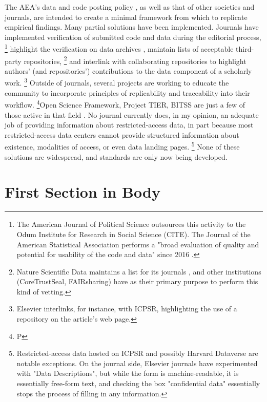 \documentclass[AEJ]{AEA}
\begin{document}
The AEA's data and code posting policy \citep{American_Economic_Association2008-az}, as well as that of other societies and journals, are intended to create a minimal framework from which to replicate empirical findings. Many partial solutions have been implemented. Journals have implemented verification of submitted code and data during the editorial process,%
\footnote{The American Journal of Political Science outsources this activity to the Odum Institute for Research in Social Science (CITE). The Journal of the American Statistical Association performs a "broad evaluation of quality and potential for usability of the code and data" since 2016 \citep{Stodden2016-uc}.}
highlight the verification on data archives \citep{Open_Science_Framework2017-zc}, maintain lists of acceptable third-party repositories,%
\footnote{Nature Scientific Data maintains a list for its journals \citep{Nature_Scientific_Data2016-hl}, and other institutions (CoreTrustSeal, FAIRsharing) have as their primary purpose to perform this kind of vetting.} 
and interlink with collaborating repositories to highlight authors' (and repositories') contributions to the data component of a scholarly work.%
\footnote{Elsevier interlinks, for instance, with ICPSR, highlighting the use of a repository on the article's web page.}
Outside of journals, several projects are working to educate the community to incorporate principles of replicability and traceability into their workflow.%
\footnote{P}Open Science Framework, Project TIER, BITSS are just a few of those active in that field \citep{Gentzkow2014-va,Wilson2016-bt}.
No journal currently does, in my opinion, an adequate job of providing information about restricted-access data, in part because most restricted-access data centers cannot provide structured information about existence, modalities of access, or even data landing pages.%
\footnote{Restricted-access data hosted on ICPSR and possibly Harvard Dataverse are notable exceptions. On the journal side, Elsevier journals have experimented with "Data Descriptions", but while the form is machine-readable, it is essentially free-form text, and checking the box "confidential data" essentially stops the process of filling in any information.} 
None of these solutions are widespread, and standards are only now being developed.



\section{First Section in Body}
\end{document}
